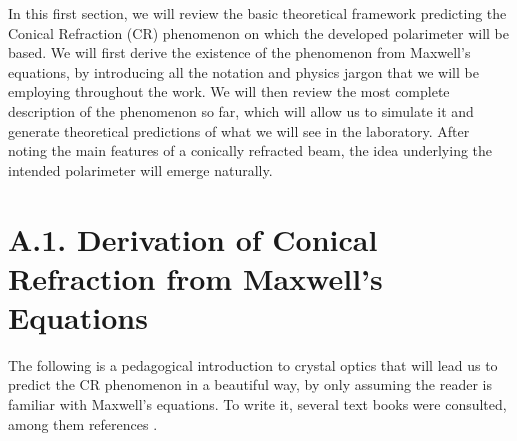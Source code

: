 \documentclass[11pt, a4paper, twoside]{article} %
\begin{document}
In this first section, we will review the basic theoretical framework predicting the Conical Refraction (CR) phenomenon on which the developed polarimeter will be based. We will first derive the existence of the phenomenon from Maxwell's equations, by introducing all the notation and physics jargon that we will be employing throughout the work. We will then review the most complete description of the phenomenon so far, which will allow us to simulate it and generate theoretical predictions of what we will see in the laboratory. After noting the main features of a conically refracted beam, the idea underlying the intended polarimeter will emerge naturally.\vspace{-0.2cm}

\section*{A.1. Derivation of Conical Refraction from Maxwell's Equations\vspace{-0.2cm}}
The following is a pedagogical introduction to crystal optics that will lead us to predict the CR phenomenon in a beautiful way, by only assuming the reader is familiar with Maxwell's equations. To write it, several text books were consulted, among them references \cite{LL,magnetostatic,fundamentals}.\vspace{-0.3cm}
\end{document}
